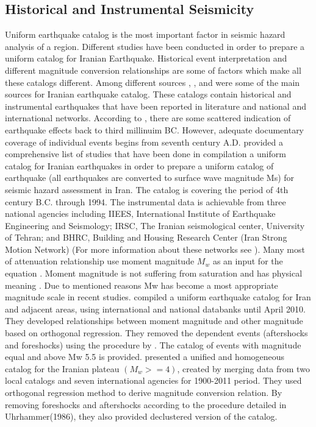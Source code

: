 \subsection{Historical  and Instrumental Seismicity}
Uniform earthquake catalog is the most important factor in seismic hazard analysis of a region.  Different studies have been conducted in order to prepare a uniform catalog for Iranian Earthquake. Historical event interpretation and different magnitude conversion relationships are some of factors which make all these catalogs different. Among different sources \citet{Ambraseys2005}, \citet{Berberian1994}, and \citet{moinfar1994} were some of the main sources for Iranian earthquake catalog. These catalogs contain historical and instrumental earthquakes that have been reported in literature and national and international networks. According to \citet{Ambraseys2005}, there are some scattered indication of earthquake effects  back to third millinuim BC. However, adequate documentary coverage of individual events begins from seventh century A.D. \citet{Mirzaei1997} provided a comprehensive list of studies that have been done in compilation a uniform catalog for Iranian earthquakes in order to prepare a uniform catalog of earthquake (all earthquakes are converted to surface wave magnitude Ms) for seismic hazard assessment in Iran. The catalog is covering the period of 4th century B.C. through 1994. The instrumental data is achievable from three national agencies including IIEES, International Institute of Earthquake Engineering and Seismology; IRSC, The Iranian seismological center, University of Tehran; and BHRC, Building and Housing Research Center (Iran Strong Motion Network) (For more information about these networks see \citet{Karimiparidari2013}).
Many most of attenuation relationship use  moment magnitude $M_w$ as an input for the equation \citep{Douglas2011}. Moment magnitude is not suffering from saturation and has physical meaning \citep{Kanamori1977}. Due to mentioned reasons Mw has become a most appropriate magnitude scale in recent studies. 
 \citet{Karimiparidari2013}compiled a uniform earthquake catalog for Iran and adjacent areas, using international and national databanks until April 2010.  They developed relationships between moment magnitude and other magnitude based on orthogonal regression.  They removed the dependent events (aftershocks and foreshocks) using the procedure by \citet{Gardner1974}. The catalog of events with magnitude equal and above Mw 5.5 is provided. 
\citet{Shahvar2013} presented a unified and homogeneous catalog for the Iranian plateau $(M_w >= 4)$, created by merging data from two local catalogs and seven international agencies for 1900-2011 period. They used orthogonal regression method \citep{Castellaro2006} to derive magnitude conversion relation. By removing foreshocks and aftershocks according to the procedure detailed in Uhrhammer(1986), they also provided declustered version of the catalog.

